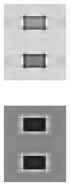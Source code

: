 \documentclass[journal,onecolumn]{IEEEtran}
\begin{document}
{\begin{figure}[H]
\begin{subfigure}[b]{0.2\textwidth}
            \caption{}
            \label{fig:test-crisp-dwt-2-ld}
    \end{subfigure}%
    \begin{subfigure}[b]{0.2\textwidth}
            \centering
            \includegraphics[width=.85\linewidth, frame]{test-crisp-dwt-3-ld}
            \caption{}
            \label{fig:test-crisp-dwt-3-ld}
    \end{subfigure}\\
    \begin{subfigure}[b]{0.2\textwidth}
            \centering
            \includegraphics[width=.85\linewidth, frame]{test-crisp-dwt-1-rg}

\end{subfigure}
\end{figure}}
\end{document}
